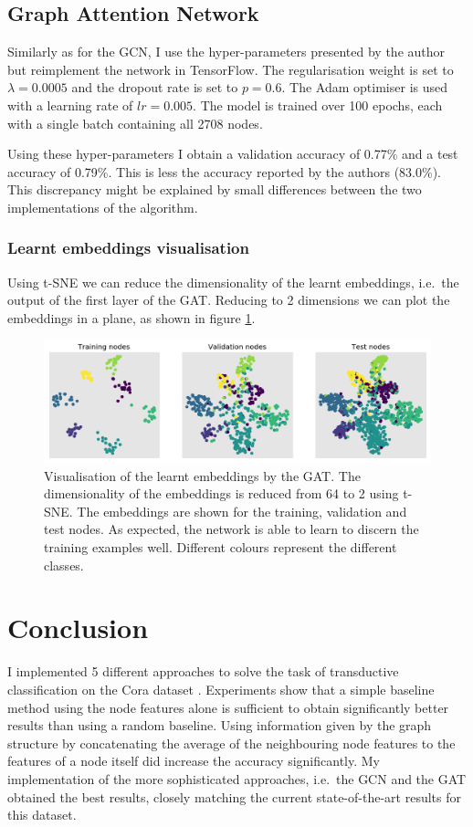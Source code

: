 \documentclass[12pt]{article}
\theoremstyle{definition}
\begin{document}
\subsection{Graph Attention Network}
Similarly as for the GCN, I use the hyper-parameters presented by the author but reimplement the network in TensorFlow. The regularisation weight is set to $\lambda = 0.0005$ and the dropout rate is set to $p=0.6$. The Adam optimiser \cite{kingma2014adam} is used with a learning rate of $\textit{lr} = 0.005$. The model is trained over 100 epochs, each with a single batch containing all 2708 nodes.

Using these hyper-parameters I obtain a validation accuracy of 0.77\% and a test accuracy of 0.79\%. This is less the accuracy reported by the authors (83.0\%). This discrepancy might be explained by small differences between the two implementations of the algorithm. 

\subsubsection{Learnt embeddings visualisation}
Using t-SNE we can reduce the dimensionality of the learnt embeddings, i.e.\ the output of the first layer of the GAT. Reducing to 2 dimensions we can plot the embeddings in a plane, as shown in figure \ref{fig/gat_tsne}.
\begin{figure}[h]
	\includegraphics[width=1.0\textwidth]{gat/visualisation_tsne}
	\centering
	\caption{Visualisation of the learnt embeddings by the GAT. The dimensionality of the embeddings is reduced from 64 to 2 using t-SNE. The embeddings are shown for the training, validation and test nodes. As expected, the network is able to learn to discern the training examples well. Different colours represent the different classes.}
	\label{fig/gat_tsne}
\end{figure}

\section{Conclusion}
	I implemented 5 different approaches to solve the task of transductive classification on the Cora dataset \cite{cora}. Experiments show that a simple baseline method using the node features alone is sufficient to obtain significantly better results than using a random baseline. Using information given by the graph structure by concatenating the average of the neighbouring node features to the features of a node itself did increase the accuracy significantly. My implementation of the more sophisticated approaches, i.e.\ the GCN and the GAT obtained the best results, closely matching the current state-of-the-art results for this dataset.	


\end{document}
